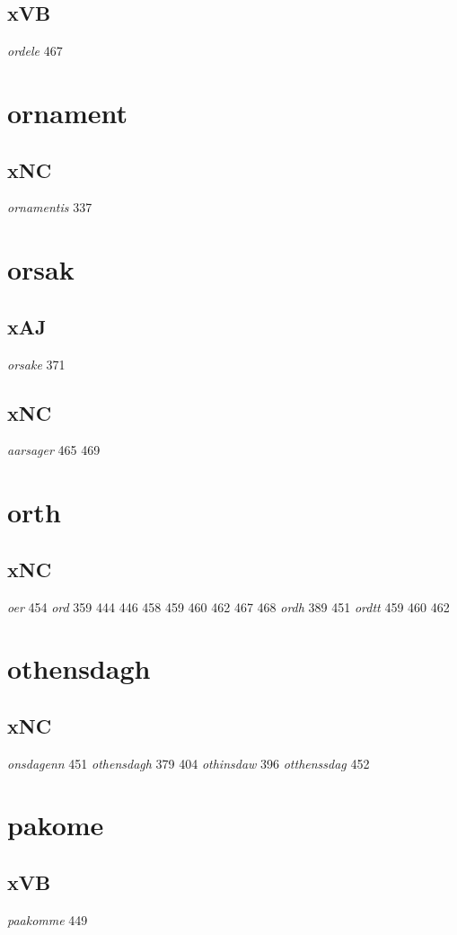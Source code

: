 \documentclass[a4paper,twocolumn]{article}
\begin{document}
\subsection{xVB}
\label{sec:orgb3ddc8e}
\emph{ordele} 467 
\section{ornament}
\label{sec:org32e2936}
\subsection{xNC}
\label{sec:orgfc69d93}
\emph{ornamentis} 337 
\section{orsak}
\label{sec:org5065c05}
\subsection{xAJ}
\label{sec:orga682df6}
\emph{orsake} 371 
\subsection{xNC}
\label{sec:orgd2093eb}
\emph{aarsager} 465 469 
\section{orth}
\label{sec:org4d69358}
\subsection{xNC}
\label{sec:org3df52a8}
\emph{oer} 454 \emph{ord} 359 444 446 458 459 460 462 467 468 \emph{ordh} 389 451 \emph{ordtt} 459 460 462 
\section{othensdagh}
\label{sec:org50f110a}
\subsection{xNC}
\label{sec:org621c207}
\emph{onsdagenn} 451 \emph{othensdagh} 379 404 \emph{othinsdaw} 396 \emph{otthenssdag} 452 
\section{pakome}
\label{sec:org69e0500}
\subsection{xVB}
\label{sec:org4c29da7}
\emph{paakomme} 449 
\end{document}
